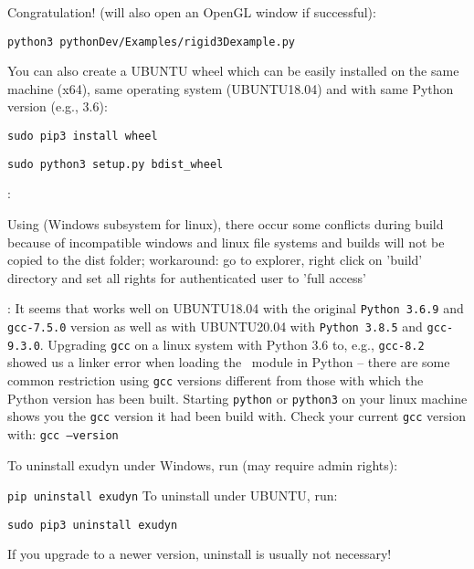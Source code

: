 \noindent 
Congratulation!  (will also open an OpenGL window if successful):
\bi
  \item[] \texttt{python3 pythonDev/Examples/rigid3Dexample.py}
\ei

\noindent You can also create a UBUNTU wheel which can be easily installed on the same machine (x64), same operating system (UBUNTU18.04) and with same Python version (e.g., 3.6):
\bi
  \item[] \texttt{sudo pip3 install wheel}
  \item[] \texttt{sudo python3 setup.py bdist\_wheel}
\ei

\noindent {}:
\bi
  \item Using  (Windows subsystem for linux), there occur some conflicts during build because of incompatible windows and linux file systems and builds will not be copied to the dist folder; workaround: go to explorer, right click on 'build' directory and set all rights for authenticated user to 'full access'
  \item {}: It seems that \codeName works well on UBUNTU18.04 with the original \texttt{Python 3.6.9} and \texttt{gcc-7.5.0} version as well as with UBUNTU20.04 with \texttt{Python 3.8.5} and \texttt{gcc-9.3.0}. Upgrading \texttt{gcc} on a linux system with Python 3.6 to, e.g., \texttt{gcc-8.2} showed us a linker error when loading the \codeName\ module in Python -- there are some common restriction using \texttt{gcc} versions different from those with which the Python version has been built. Starting \texttt{python} or \texttt{python3} on your linux machine shows you the \texttt{gcc} version it had been build with. Check your current \texttt{gcc} version with: \texttt{gcc --version}
\ei


To uninstall exudyn under Windows, run (may require admin rights):
\bi
  \item[] \texttt{pip uninstall exudyn}
\ei
\noindent To uninstall under UBUNTU, run:
\bi
  \item[] \texttt{sudo pip3 uninstall exudyn}
\ei

If you upgrade to a newer version, uninstall is usually not necessary!
%

